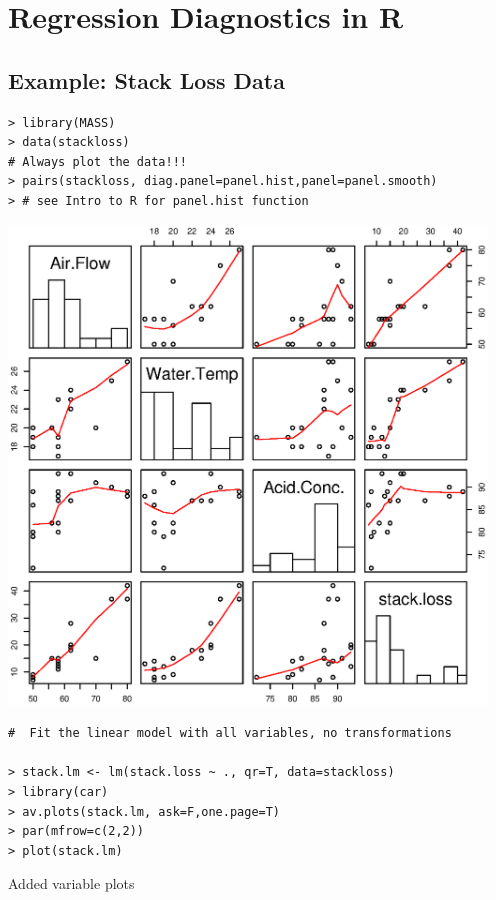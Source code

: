 \documentclass[11]{article}
\begin{document}
\section*{Regression Diagnostics in R}
\subsection*{Example: Stack Loss Data}
\begin{verbatim}
> library(MASS)
> data(stackloss)
# Always plot the data!!!
> pairs(stackloss, diag.panel=panel.hist,panel=panel.smooth)
> # see Intro to R for panel.hist function
\end{verbatim}


\centerline{\includegraphics[height=5in]{stackloss-pair.ps}}

\begin{verbatim}
#  Fit the linear model with all variables, no transformations

> stack.lm <- lm(stack.loss ~ ., qr=T, data=stackloss)
> library(car)
> av.plots(stack.lm, ask=F,one.page=T)
> par(mfrow=c(2,2))
> plot(stack.lm)
\end{verbatim}
\newpage
Added variable plots
\end{document}
